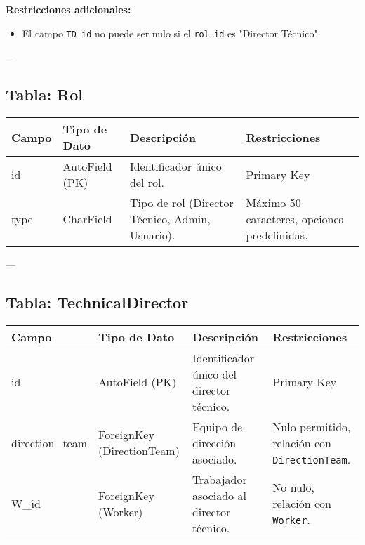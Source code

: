 \documentclass{report}
\begin{document}
    \textbf{Restricciones adicionales:}
    \begin{itemize}
        \item El campo \texttt{TD\_id} no puede ser nulo si el \texttt{rol\_id} es "Director Técnico".
    \end{itemize}
    
    ---
    
    \subsection*{Tabla: Rol}
    \begin{tabular}{|>{\raggedright\arraybackslash}p{3cm}|>{\raggedright\arraybackslash}p{3cm}|>{\raggedright\arraybackslash}p{6cm}|>{\raggedright\arraybackslash}p{4cm}|}
        \hline
        \textbf{Campo} & \textbf{Tipo de Dato} & \textbf{Descripción} & \textbf{Restricciones} \\
        \hline
        id & AutoField (PK) & Identificador único del rol. & Primary Key \\
        \hline
        type & CharField & Tipo de rol (Director Técnico, Admin, Usuario). & Máximo 50 caracteres, opciones predefinidas. \\
        \hline
    \end{tabular}
    
    ---
    
    \subsection*{Tabla: TechnicalDirector}
    \begin{tabular}{|>{\raggedright\arraybackslash}p{3cm}|>{\raggedright\arraybackslash}p{3cm}|>{\raggedright\arraybackslash}p{6cm}|>{\raggedright\arraybackslash}p{4cm}|}
        \hline
        \textbf{Campo} & \textbf{Tipo de Dato} & \textbf{Descripción} & \textbf{Restricciones} \\
        \hline
        id & AutoField (PK) & Identificador único del director técnico. & Primary Key \\
        \hline
        direction\_team & ForeignKey (DirectionTeam) & Equipo de dirección asociado. & Nulo permitido, relación con \texttt{DirectionTeam}. \\
        \hline
        W\_id & ForeignKey (Worker) & Trabajador asociado al director técnico. & No nulo, relación con \texttt{Worker}. \\
        \hline
    \end{tabular}
    
\end{document}
